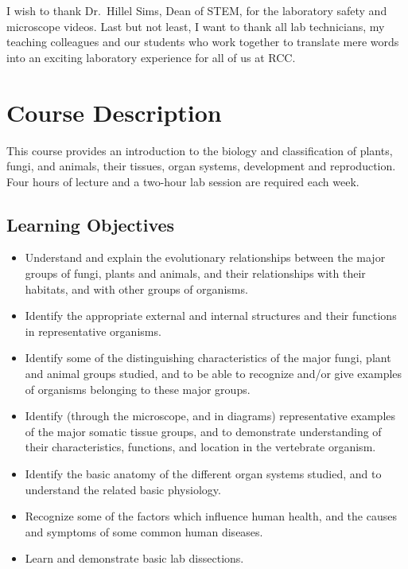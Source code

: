 \documentclass[]{book}
\theoremstyle{definition}
\theoremstyle{definition}
\theoremstyle{definition}
\theoremstyle{remark}
\begin{document}
\begin{multicols}{2}
I wish to thank Dr.~Hillel Sims, Dean of STEM, for the laboratory safety
and microscope videos. Last but not least, I want to thank all lab
technicians, my teaching colleagues and our students who work together
to translate mere words into an exciting laboratory experience for all
of us at RCC.

\end{multicols}

\chapter*{Course Description}\label{course-description}

This course provides an introduction to the biology and classification
of plants, fungi, and animals, their tissues, organ systems, development
and reproduction. Four hours of lecture and a two-hour lab session are
required each week.

\section*{Learning Objectives}\label{learning-objectives}

\begin{itemize}
\item
  Understand and explain the evolutionary relationships between the
  major groups of fungi, plants and animals, and their relationships
  with their habitats, and with other groups of organisms.
\item
  Identify the appropriate external and internal structures and their
  functions in representative organisms.
\item
  Identify some of the distinguishing characteristics of the major
  fungi, plant and animal groups studied, and to be able to recognize
  and/or give examples of organisms belonging to these major groups.
\item
  Identify (through the microscope, and in diagrams) representative
  examples of the major somatic tissue groups, and to demonstrate
  understanding of their characteristics, functions, and location in the
  vertebrate organism.
\item
  Identify the basic anatomy of the different organ systems studied, and
  to understand the related basic physiology.
\item
  Recognize some of the factors which influence human health, and the
  causes and symptoms of some common human diseases.
\item
  Learn and demonstrate basic lab dissections.
\end{itemize}
\end{document}

